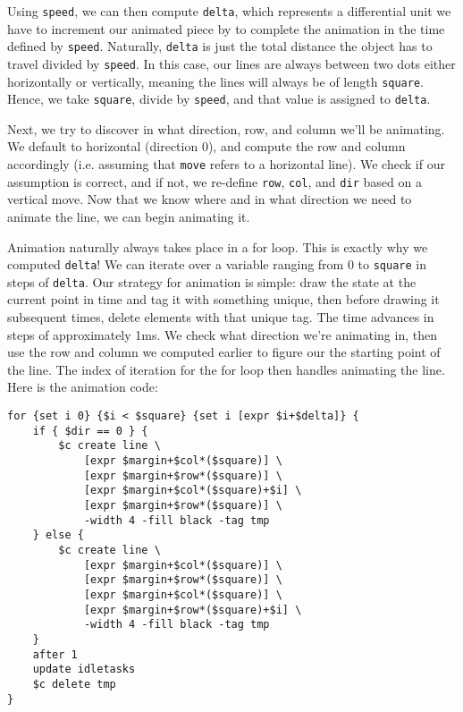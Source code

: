 \documentclass{article}
\begin{document}
Using \texttt{speed}, we can then compute \texttt{delta}, which represents a differential unit we have to increment our animated piece by to complete the animation in the time defined by \texttt{speed}. Naturally, \texttt{delta} is just the total distance the object has to travel divided by \texttt{speed}. In this case, our lines are always between two dots either horizontally or vertically, meaning the lines will always be of length \texttt{square}. Hence, we take \texttt{square}, divide by \texttt{speed}, and that value is assigned to \texttt{delta}.

Next, we try to discover in what direction, row, and column we'll be animating. We default to horizontal (direction 0), and compute the row and column accordingly (i.e. assuming that \texttt{move} refers to a horizontal line). We check if our assumption is correct, and if not, we re-define \texttt{row}, \texttt{col}, and \texttt{dir} based on a vertical move. Now that we know where and in what direction we need to animate the line, we can begin animating it.

Animation naturally always takes place in a for loop. This is exactly why we computed \texttt{delta}! We can iterate over a variable ranging from 0 to \texttt{square} in steps of \texttt{delta}. Our strategy for animation is simple: draw the state at the current point in time and tag it with something unique, then before drawing it subsequent times, delete elements with that unique tag. The time advances in steps of approximately 1ms. We check what direction we're animating in, then use the row and column we computed earlier to figure our the starting point of the line. The index of iteration for the for loop then handles animating the line. Here is the animation code:

\begin{verbatim}
for {set i 0} {$i < $square} {set i [expr $i+$delta]} {
    if { $dir == 0 } {
        $c create line \
            [expr $margin+$col*($square)] \
            [expr $margin+$row*($square)] \
            [expr $margin+$col*($square)+$i] \
            [expr $margin+$row*($square)] \
            -width 4 -fill black -tag tmp
    } else {
        $c create line \
            [expr $margin+$col*($square)] \
            [expr $margin+$row*($square)] \
            [expr $margin+$col*($square)] \
            [expr $margin+$row*($square)+$i] \
            -width 4 -fill black -tag tmp
    }
    after 1
    update idletasks
    $c delete tmp
}
\end{verbatim}
\end{document}
